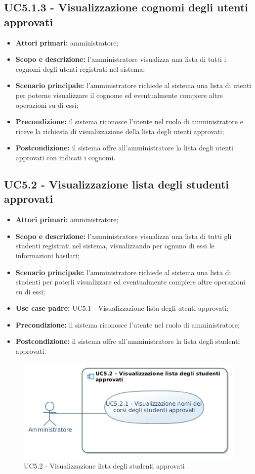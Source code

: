 \documentclass[AnalisiDeiRequisiti.tex]{subfiles}
\begin{document}
\subsection{UC5.1.3 - Visualizzazione cognomi degli utenti approvati}
\begin{itemize}
	\item \textbf{Attori primari:} amministratore;
	\item \textbf{Scopo e descrizione:} l'amministratore visualizza una lista di tutti i cognomi degli utenti registrati nel sistema;
	\item \textbf{Scenario principale:} l'amministratore richiede al sistema una lista di utenti per poterne visualizzare il cognome ed eventualmente compiere altre operazioni su di essi;
	\item \textbf{Precondizione:} il sistema riconosce l'utente nel ruolo di amministratore e riceve la richiesta di visualizzazione della lista degli utenti approvati;
	\item \textbf{Postcondizione:} il sistema offre all'amministratore la lista degli utenti approvati con indicati i cognomi.
\end{itemize}
\subsection{UC5.2 - Visualizzazione lista degli studenti approvati}
\begin{itemize}
	\item \textbf{Attori primari:} amministratore;
	\item \textbf{Scopo e descrizione:} l'amministratore visualizza una lista di tutti gli studenti registrati nel sistema, visualizzando per ognuno di essi le informazioni basilari;
	\item \textbf{Scenario principale:} l'amministratore richiede al sistema una lista di studenti per poterli visualizzare ed eventualmente compiere altre operazioni su di essi;
	\item \textbf{Use case padre:} UC5.1 - Visualizzazione lista degli utenti approvati;
	\item \textbf{Precondizione:} il sistema riconosce l'utente nel ruolo di amministratore; 
	\item \textbf{Postcondizione:} il sistema offre all'amministratore la lista degli studenti approvati.
\end{itemize}
\begin{figure}[H]
	\centering
	\includegraphics[width=0.9\linewidth]{UC5_2.jpg}
	\caption{UC5.2 - Visualizzazione lista degli studenti approvati}
	\label{fig:UC5.2 - Visualizzazione lista degli studenti approvati}
\end{figure}
\end{document}
